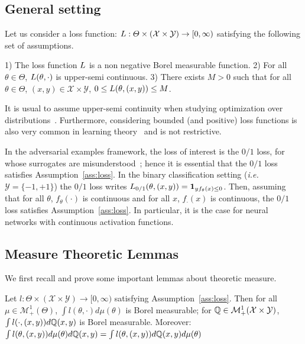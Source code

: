 \subsection{General setting}
Let us consider a loss function: $L:\Theta\times (\mathcal{X}\times\mathcal{Y})\to [0,\infty)$ satisfying the following set of assumptions.
\begin{assump}
\label{ass:loss}
1) The loss function $L$ is a non negative Borel measurable function. 2) For all $\theta\in\Theta$, $L(\theta,\cdot)$ is upper-semi continuous. 3) There exists $M>0$ such that for all $\theta\in\Theta$, $(x,y)\in\mathcal{X}\times\mathcal{Y}$, $0\leq L(\theta,(x,y))\leq M$.
\end{assump}
It is usual to assume upper-semi continuity when studying optimization over distributions~\citep{villani2003topics,blanchet2019quantifying}. Furthermore, considering bounded (and positive) loss functions is also very common in learning theory~\citep{bartlett2002rademacher} and is not restrictive. 

In the adversarial examples framework, the loss of interest is the $0/1$ loss, for whose surrogates are misunderstood~\citep{pmlr-v97-cranko19a,pmlr-v125-bao20a}; hence it is essential that the $0/1$ loss satisfies Assumption~\ref{ass:loss}. In the binary classification setting (\emph{i.e.} $\mathcal{Y}=\{-1,+1\}$) the $0/1$ loss writes $L_{0/1}(\theta,(x,y)) = \mathbf{1}_{yf_\theta(x)\leq 0}$. Then, assuming that for all $\theta$, $f_\theta(\cdot)$ is continuous and for all $x$, $f_\cdot(x)$ is continuous, the $0/1$ loss satisfies Assumption~\ref{ass:loss}. In particular, it is the case for neural networks with continuous activation functions.


\subsection{Measure Theoretic Lemmas}

We first recall and prove some important lemmas about theoretic measure.
\begin{lemma}
\label{lem:fubini}
Let $l:\Theta\times(\mathcal{X}\times\mathcal{Y})\rightarrow [0,\infty)$ satisfying Assumption~\ref{ass:loss}. Then for all $\mu\in\mathcal{M}^1_+(\Theta)$, $\int l(\theta,\cdot)d\mu(\theta)$ is Borel measurable; for  $\mathbb{Q}\in\mathcal{M}^1_+(\mathcal{X}\times\mathcal{Y})$, $\int l(\cdot,(x,y))d\mathbb{Q}(x,y)$ is Borel measurable. Moreover: $\int l(\theta,(x,y))d\mu(\theta)d\mathbb{Q}(x,y)=\int l(\theta,(x,y))d\mathbb{Q}(x,y)d\mu(\theta)$
\end{lemma}

